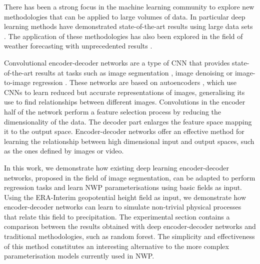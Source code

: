 \documentclass[twocol]{ametsoc}
\begin{document}
There has been a strong focus in the machine learning community to explore new methodologies that can be applied to large volumes of data. In particular deep learning \citep{lecun2015deep} methods have demonstrated state-of-the-art results using large data sets \citep{deng2009imagenet,openimages}. The application of these methodologies has also been explored in the field of weather forecasting with unprecedented results \citep{xingjian2015convolutional,liu2016application,rasp2018deep}.

Convolutional encoder-decoder networks are a type of CNN that provides state-of-the-art results at tasks such as image segmentation \citep{badrinarayanan2017segnet}, image denoising \citep{mao2016image} or image-to-image regression \citep{isola2017image}. These networks are based on autoencoders \citep{hinton2006reducing}, which use CNNs to learn reduced but accurate representations of images, generalising its use to find relationships between different images. Convolutions in the encoder half of the network perform a feature selection process by reducing the dimensionality of the data. The decoder part enlarges the feature space mapping it to the output space. Encoder-decoder networks offer an effective method for learning the relationship between high dimensional input and output spaces, such as the ones defined by images or video.


In this work, we demonstrate how existing deep learning encoder-decoder networks, proposed in the field of image segmentation, can be adapted to perform regression tasks and learn NWP parameterisations using basic fields as input. Using the ERA-Interim geopotential height field as input, we demonstrate how encoder-decoder networks can learn to simulate non-trivial physical processes that relate this field to precipitation. The experimental section contains a comparison between the results obtained with deep encoder-decoder networks and traditional methodologies, such as random forest. The simplicity and effectiveness of this method constitutes an interesting alternative to the more complex parameterisation models currently used in NWP.
\end{document}
